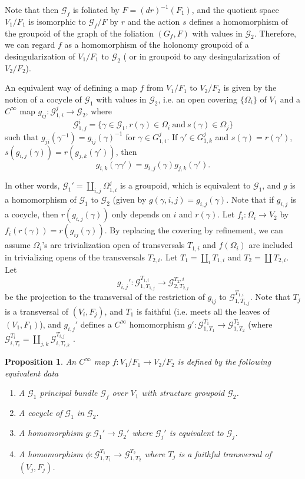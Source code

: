 \documentclass[12pt]{amsart}
\newtheorem{prop}[thm]{Proposition}
\theoremstyle{definition}
\theoremstyle{remark}
\numberwithin{equation}{section}
\newcommand{\CG}{{\mathcal G}}
\begin{document}
Note that then $\CG_f$ is foliated by $F=(dr)^{-1}(F_1)$, and the quotient space $V_1/F_1$ is isomorphic to $\CG_f/F$ by $r$ and the action $s$ defines a homomorphism of the groupoid of the graph of the foliation $(G_f, F)$ with values in $\CG_2$. Therefore, we can regard $f$ as a homomorphism of the holonomy groupoid of a desingularization of $V_1/F_1$ to $\CG_2$ ( or in groupoid to any desingularization of $V_2/F_2$).

An equivalent way of defining a map $f$ from $V_1/F_1$ to $V_2/F_2$ is given by the notion of a cocycle of $\CG_1$ with values in $\CG_2$, i.e. an open covering $\{\Omega_i\}$   of $V_1$ and a $C^{\infty}$ map $g_{ij}: \CG_{1,i}^j \to \CG_2$, where
\begin{equation}
\CG_{1,j}^i=\{ \gamma\in \CG_1, r(\gamma)\in \Omega_i\ \text{and}\ s(\gamma)\in \Omega_j\}
\end{equation}
such that $g_{ji}(\gamma^{-1})=g_{ij}(\gamma)^{-1}$ for $\gamma\in G_{1,i}^j$. If $\gamma'\in  G_{1,k}^j$ and $s(\gamma)=r(\gamma')$, $s(g_{i,j}(\gamma))=r(g_{j,k}(\gamma'))$, then  
\begin{equation}
g_{i,k}(\gamma\gamma')=g_{i,j}(\gamma)g_{j,k}(\gamma').
\end{equation}

In other words, $\CG_1'=\coprod_{i,j}\Omega_{1,i}^j$ is a groupoid, which is equivalent to $\CG_1$, and $g$ is a homomorphism of $\CG_1$ to $\CG_2$ (given by $g(\gamma, i , j) = g_{i, j} (\gamma)$. Note that if $g_{i,j}$ is a cocycle, then $r(g_{i,j}(\gamma))$ only depends on $i$ and $r(\gamma)$. Let $f_i:\Omega_i \to V_2$ by $f_i(r(\gamma))=r(g_{ij}(\gamma))$.  By replacing the covering by refinement, we can assume $\Omega_i$'s  are  trivialization open  of transversals $T_{1,i}$ and $f(\Omega_i)$ are included in trivializing opens of the  transversals $T_{2,i}$. Let $T_1=\coprod_i T_{1,i}$ and $T_2=\coprod T_{2,i}$. Let
\begin{equation}
g_{i,j}': \CG_{1,T_{1,j}}^{T_{1,i}}\to \CG_{2,T_{2,j}}^{T{_2,i}}
\end{equation}
be the projection to the transversal of the restriction of $g_{ij}$ to $\CG_{1,T_{1,j}}^{T_{1,i}}$. Note that $T_j$ is a transversal of $(V_i,F_j)$, and $T_1$ is faithful (i.e. meets all the leaves of $(V_1,F_1)$), and $g_{i,j}' $ defines a $C^{\infty}$ homomorphism $g': \CG_{1,T_1}^{T_1}\to \CG_{1,T_2}^{T_2}$ (where $\CG_{i,T_i}^{T_i} = \coprod_{j, k} \CG_{i,T_{i,k}}^{T_{i, j}}$ . 
\begin{prop}
	An $C^{\infty}$ map $f:V_1/F_1 \to V_2/F_2$ is defined by the following equivalent data
	\begin{enumerate}
		\item A $\CG_1$ principal bundle  $\CG_f$ over $V_1$ with structure groupoid $\CG_2$.
		\item A cocycle of $\CG_1$ in $\CG_2$.
		\item A homomorphism $g:\CG_1' \to \CG_2'$ where $\CG_j'$ is equivalent to $\CG_j$.
		\item A homomorphism $\phi:  \CG_{1,T_1}^{T_1}\to \CG_{1,T_2}^{T_2}$ where $T_j$ is a faithful transversal of $(V_j,F_j)$.
	\end{enumerate}
\end{prop}
\end{document}
